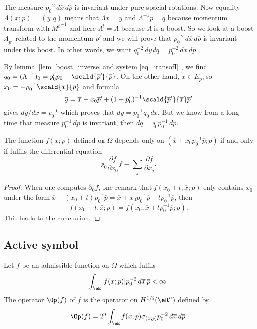 The measure $p_0^{-2}\,d\overline{x}\,d\overline{p}$ is invariant under pure spacial rotations. Now equality $\Lambda(x;p)=(y;q)$ means that $\Lambda x=y$ and $\Lambda^{-1}p=q$ because momentum transform with ${M^t}^{-1}$ and here $\Lambda^t=\Lambda$ because $\Lambda$ is a boost. So we look at a boost $\Lambda_{\overline{p'}}$ related to the momentum $p'$ and we will prove that $p_0^{-2}\,d\overline{x}\,d\overline{p}$ is invariant under this boost. In other words, we want $q_0^{-2}\,d\overline{ y }\,d\overline{ q }=p_0^{-2}\,d\overline{x}\,d\overline{p}$.

By lemma~\ref{lem_boost_inverse} and system \eqref{eq_transofI} , we find $q_0=(\Lambda^{-1})_0=p'_0p_0+\scald{ \overline{p}' }{ \overline{p} }$. On the other hand, $x\in E_p$, so $x_0=-p_0^{-1}\scald{ \overline{x} }{ \overline{p} }$ and formula
\[
	\overline{ y }=\overline{x}-x_0\overline{p}'+(1+p'_0)^{-1}\scald{ \overline{p}' }{ \overline{x} }\overline{p}'
\]
gives $d\overline{ y }/d\overline{x}=p_0^{-1}$ which proves that $d\overline{ y }=p_0^{-1}q_0\,d\overline{x}$. But we know from a long time that measure $p_0^{-1}\,d\overline{p}$ is invariant, then $d\overline{ q }=q_0p_0^{-1}\,d\overline{p}$.

\begin{lemma}
	The function $f(x;p)$ defined on $\Omega$ depends only on $(\overline{x}+x_0p_0^{-1}\overline{p};p)$ if and only if fulfils the differential equation
	\begin{equation}
		p_0\frac{ \partial f }{ \partial x_0 }f=\sum_j \frac{ \partial f }{ \partial x_j }.
	\end{equation}

\end{lemma}


\begin{proof}
	When one computes $\partial_0f$, one remark that $f(x_0+t,\overline{x};p)$ only contains $x_0$ under the form $\overline{x}+(x_0+t)p_0^{-1}\overline{p}=\overline{x}+x_0p_0^{-1}\overline{p}+tp_0^{-1}\overline{p}$, then
	\[
		f(x_0+t,\overline{x};p)=f(x_0,\overline{x}+tp_0^{-1}\overline{p};p).
	\]
	This leads to the conclusion.
\end{proof}

\subsection{Active symbol}

Let $f$ be an admissible function on $\Omega$ which fulfils
\[
	\int_{\eE} | f(x;p) |p_0^{-2}\,d\overline{x}\,\overline{p}<\infty.
\]
The operator $\Op(f)$ of  $f$ is the operator on $H^{1/2}(\eR^n)$ defined by
\begin{equation}
	\Op(f)=2^n\int_{\eE} f(x;p)\sigma_{(x;p)}p_0^{-2}\,d\overline{x}\,d\overline{p}.
\end{equation}

